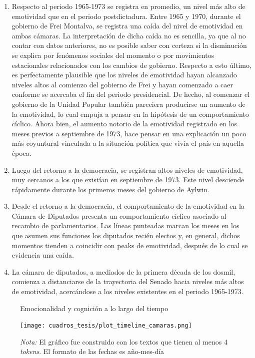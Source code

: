 \documentclass[
  12pt,
]{article}
\begin{document}
\begin{enumerate}
\def\labelenumi{\arabic{enumi})}
\item
  Respecto al periodo 1965-1973 se registra en promedio, un nivel más
  alto de emotividad que en el periodo postdictadura. Entre 1965 y 1970,
  durante el gobierno de Frei Montalva, se registra una caída del nivel
  de emotividad en ambas cámaras. La interpretación de dicha caída no es
  sencilla, ya que al no contar con datos anteriores, no es posible
  saber con certeza si la disminución se explica por fenómenos sociales
  del momento o por movimientos estacionales relacionados con los
  cambios de gobierno. Respecto a esto último, es perfectamente
  plausible que los niveles de emotividad hayan alcanzado niveles altos
  al comienzo del gobierno de Frei y hayan comenzado a caer conforme se
  acercaba el fin del periodo presidencial. De hecho, al comenzar el
  gobierno de la Unidad Popular también pareciera producirse un aumento
  de la emotividad, lo cual empuja a pensar en la hipótesis de un
  comportamiento cíclico. Ahora bien, el aumento notorio de la
  emotividad registrado en los meses previos a septiembre de 1973, hace
  pensar en una explicación un poco más coyuntural vinculada a la
  situación política que vivía el país en aquella época.
\item
  Luego del retorno a la democracia, se registran altos niveles de
  emotividad, muy cercanos a los que existían en septiembre de 1973.
  Este nivel desciende rápidamente durante los primeros meses del
  gobierno de Aylwin.
\item
  Desde el retorno a la democracia, el comportamiento de la emotividad
  en la Cámara de Diputados presenta un comportamiento cíclico asociado
  al recambio de parlamentarios. Las líneas punteadas marcan los meses
  en los que asumen sus funciones los diputados recién electos y, en
  general, dichos momentos tienden a coincidir con peaks de emotividad,
  después de lo cual se evidencia una caída.
\item
  La cámara de diputados, a mediados de la primera década de los dosmil,
  comienza a distanciarse de la trayectoria del Senado hacia niveles más
  altos de emotividad, acercándose a los niveles existentes en el
  periodo 1965-1973.
\end{enumerate}

\begin{figure}[H]
\centering
\large
\caption{Emocionalidad y cognición a lo largo del tiempo}
\label{score_time}
\texttt{[image: cuadros\_tesis/plot\_timeline\_camaras.png]}
     \caption*{\footnotesize{\textit{Nota:} El gráfico fue construido con los textos que tienen al menos 4 \textit{tokens}. El formato de las fechas es año-mes-día }}
\normalsize
\end{figure}
\end{document}
